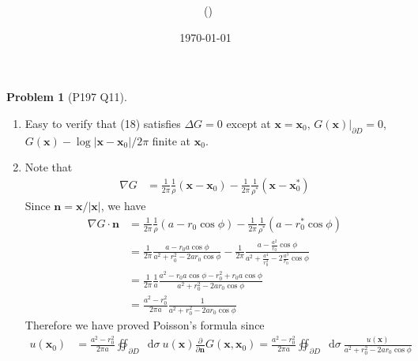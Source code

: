 \documentclass[twoside,11pt]{article}
\title{{\sffamily \Code \ \Ass}}
\author{\sffamily \name \ (\href{mailto:\mail}{\mail})}
\date{\sffamily \today}
\makeatletter
\renewcommand*\d{\mathop{}\!\mathrm{d}}
\theoremstyle{definition}
\newtheorem{problem}{Problem}
\theoremstyle{remark}
\newtheorem*{remark}{Remark}
\renewcommand{\maketitle}{\bgroup\setlength{\parindent}{0pt}
\begin{flushleft}
  \textbf{\Large\@title}

  \@author
\end{flushleft}\egroup
}
\makeatother
\begin{document}
\maketitle
\thispagestyle{title}


\begin{problem}[P197 Q11]\
\begin{enumerate}[label=(\alph*)]
\item Easy to verify that (18) satisfies $\Delta G = 0$ except at $\mathbf{x}=\mathbf{x}_0$,
$G(\mathbf{x})|_{\partial D} = 0$, $G(\mathbf{x}) - \log|\mathbf{x}-\mathbf{x}_0|/2\pi$ finite
at $\mathbf{x}_0$.

\item Note that
\begin{align*}
    \nabla G &= \frac{1}{2\pi}\frac{1}{\rho}(\mathbf{x}-\mathbf{x}_0)
    - \frac{1}{2\pi}\frac{1}{\rho^*}(\mathbf{x}-\mathbf{x}_0^*)
\end{align*}
Since $\mathbf{n} = \mathbf{x}/|\mathbf{x}|$, we have
\begin{align*}
    \nabla G\cdot\mathbf{n} &= \frac{1}{2\pi}\frac{1}{\rho}(a-r_0\cos\phi)
    - \frac{1}{2\pi}\frac{1}{\rho^*}(a-r_0^*\cos\phi)\\
    &= \frac{1}{2\pi}\frac{a-r_0a\cos\phi}{a^2+r_0^2-2ar_0\cos\phi}
    -\frac{1}{2\pi}\frac{a-\frac{a^2}{r_0}\cos\phi}{a^2+\frac{a^4}{r_0^2}-2\frac{a^3}{r_0}\cos\phi}\\
    &= \frac{1}{2\pi}\frac{1}{a}\frac{a^2-r_0a\cos\phi - r_0^2 + r_0a\cos\phi}{a^2+r_0^2-2ar_0\cos\phi}\\
    &= \frac{a^2-r_0^2}{2\pi a}\frac{1}{a^2+r_0^2-2ar_0\cos\phi}
\end{align*}
Therefore we have proved Poisson's formula since
\begin{align*}
    u(\mathbf{x}_0) &= 
    \frac{a^2-r_0^2}{2\pi a}
    \oiint_{\partial D}\d\sigma\ 
    u(\mathbf{x})\frac{\partial}{\partial \mathbf{n}}G(\mathbf{x},\mathbf{x}_0)
    =
    \frac{a^2-r_0^2}{2\pi a}
    \oiint_{\partial D}\d\sigma \
    \frac{u(\mathbf{x})}{a^2+r_0^2-2ar_0\cos\phi}
\end{align*}

\end{enumerate}
\end{problem}
\end{document}
